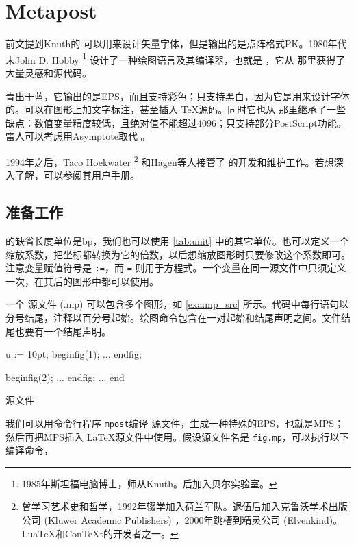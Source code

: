 \chapter{Metapost}
\label{sec:mp}

前文提到Knuth的 \MF 可以用来设计矢量字体，但是输出的是点阵格式PK。1980年代末John D. Hobby\indexHobby{} \footnote{1985年斯坦福电脑博士，师从Knuth。后加入贝尔实验室。} 设计了一种绘图语言及其编译器，也就是 \MP ，它从 \MF 那里获得了大量灵感和源代码。

\MP 青出于蓝，它输出的是EPS，而且支持彩色；\MF 只支持黑白，因为它是用来设计字体的。\MP 可以在图形上加文字标注，甚至插入 \TeX 源码。同时它也从 \MF 那里继承了一些缺点：数值变量精度较低，且绝对值不能超过4096；只支持部分PostScript功能。雷人可以考虑用Asymptote取代 \MP。

1994年之后，Taco Hoekwater\indexHoekwater{} \footnote{曾学习艺术史和哲学，1992年辍学加入荷兰军队。退伍后加入克鲁沃学术出版公司 (Kluwer Academic Publishers) ，2000年跳槽到精灵公司 (Elvenkind)。LuaTeX和Con\TeX{}t的开发者之一。} 和Hagen等人接管了 \MP 的开发和维护工作。若想深入了解，可以参阅其用户手册\citep{Hobby_2010}。

\section{准备工作}

\MP 的缺省长度单位是bp，我们也可以使用 \autoref{tab:unit} 中的其它单位。也可以定义一个缩放系数，把坐标都转换为它的倍数，以后想缩放图形时只要修改这个系数即可。注意变量赋值符号是 \texttt{:=}，而 \texttt{=} 则用于方程式。一个变量在同一源文件中只须定义一次，在其后的图形中都可以使用。

一个 \MP 源文件 (.mp) 可以包含多个图形，如 \autoref{exa:mp_src} 所示。代码中每行语句以分号结尾，注释以百分号起始。绘图命令包含在一对起始和结尾声明之间。文件结尾也要有一个结尾声明。

\begin{example}[h]
\begin{Code}[numbers=left]
u := 10pt;   %
beginfig(1); %
...          %
endfig;      %

beginfig(2);
...
endfig;
...
end          %
\end{Code}
\caption{\MP 源文件}
\label{exa:mp_src}
\end{example}

我们可以用命令行程序 \texttt{mpost}编译 \MP 源文件，生成一种特殊的EPS，也就是MPS；然后再把MPS插入 \LaTeX 源文件中使用。假设源文件名是 \texttt{fig.mp}，可以执行以下编译命令，

